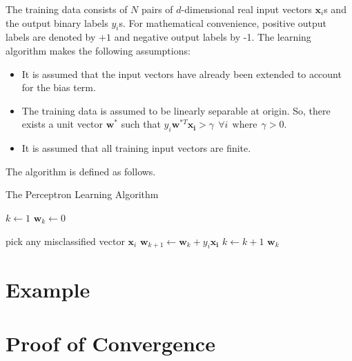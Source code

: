 \documentclass[11pt, a4paper]{article}
\begin{document}
The training data consists of $N$ pairs of $d$-dimensional real input vectors $\boldsymbol{x}_i$s and the output binary labels $y_i$s. For mathematical convenience, positive output labels are denoted by $+1$ and negative output labels by {-1}. 
The learning algorithm makes the following assumptions:

\begin{itemize}
	\item It is assumed that the input vectors have already been extended to account for the bias term.
	\item The training data is assumed to be linearly separable at origin. So, there exists a unit vector $\boldsymbol{w}^*$ such that $y_i\boldsymbol{w}^{*T}\boldsymbol{x_i} > \gamma \ \ \forall i \ \ \text{where}\ \ \gamma > 0$.
	\item It is assumed that all training input vectors are finite.
\end{itemize} 

The algorithm is defined as follows.

\begin{algorithm}
	\renewcommand{\thealgorithm}{}
	\caption{The Perceptron Learning Algorithm}
	\begin{algorithmic} 
		\STATE $k \leftarrow 1$
		\STATE $\boldsymbol{w}_k \leftarrow 0$
		
		\STATE pick any misclassified vector $\boldsymbol{x}_i$
		\STATE $\boldsymbol{w}_{k+1} \leftarrow \boldsymbol{w}_k + y_i \boldsymbol{\boldsymbol{x}_i}$
		\STATE $ k \leftarrow k + 1$
		\ENDWHILE
		\RETURN $\boldsymbol{w}_k$
	\end{algorithmic}
\end{algorithm}

\section{Example}

\section{Proof of Convergence}
\end{document}
